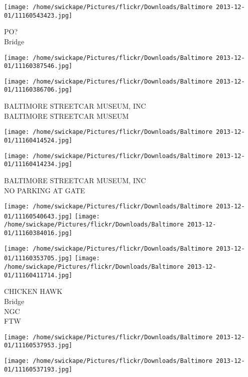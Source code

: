 \documentclass[10pt,letterpaper]{article}
\begin{document}
\vspace{0.25in}
\texttt{[image: /home/swickape/Pictures/flickr/Downloads/Baltimore 2013-12-01/11160543423.jpg]}

PO?\\
Bridge\\
\pagebreak

\texttt{[image: /home/swickape/Pictures/flickr/Downloads/Baltimore 2013-12-01/11160387546.jpg]}

\vspace{0.25in}
\texttt{[image: /home/swickape/Pictures/flickr/Downloads/Baltimore 2013-12-01/11160386706.jpg]}

BALTIMORE STREETCAR MUSEUM, INC\\
BALTIMORE STREETCAR MUSEUM\\
\pagebreak

\texttt{[image: /home/swickape/Pictures/flickr/Downloads/Baltimore 2013-12-01/11160414524.jpg]}

\vspace{0.25in}
\texttt{[image: /home/swickape/Pictures/flickr/Downloads/Baltimore 2013-12-01/11160414234.jpg]}

BALTIMORE STREETCAR MUSEUM, INC\\
NO PARKING AT GATE\\
\pagebreak

\texttt{[image: /home/swickape/Pictures/flickr/Downloads/Baltimore 2013-12-01/11160540643.jpg]}
\texttt{[image: /home/swickape/Pictures/flickr/Downloads/Baltimore 2013-12-01/11160384016.jpg]}

\texttt{[image: /home/swickape/Pictures/flickr/Downloads/Baltimore 2013-12-01/11160353705.jpg]}
\texttt{[image: /home/swickape/Pictures/flickr/Downloads/Baltimore 2013-12-01/11160411714.jpg]}

CHICKEN HAWK\\
Bridge\\
NGC\\
FTW\\
\pagebreak

\texttt{[image: /home/swickape/Pictures/flickr/Downloads/Baltimore 2013-12-01/11160537953.jpg]}

\vspace{0.25in}
\texttt{[image: /home/swickape/Pictures/flickr/Downloads/Baltimore 2013-12-01/11160537193.jpg]}
\end{document}
